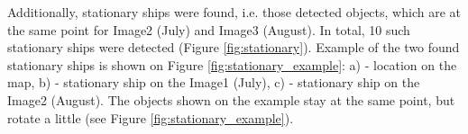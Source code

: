 
Additionally, stationary ships were found, i.e. those detected objects, which are at the same point for Image2 (July) and Image3 (August). In total, 10 such stationary ships were detected (Figure \ref{fig:stationary}). Example of the two found stationary ships is shown on Figure \ref{fig:stationary_example}: a) - location on the map, b) - stationary ship on the Image1 (July), c) - stationary ship on the Image2 (August). The objects shown on the example stay at the same point, but rotate a little (see Figure \ref{fig:stationary_example}).